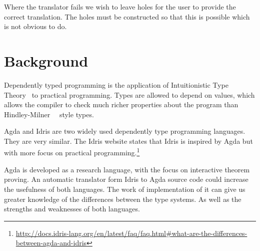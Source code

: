 \documentclass[parskip=half]{scrartcl}
\begin{document}
Where the translator fails we wish to leave holes for the user to provide the
correct translation. The holes must be constructed so that this is possible
which is not obvious to do.







\section{Background}

Dependently typed programming is the application of
Intuitionistic Type Theory~\cite{martinlof} to practical programming.  Types
are allowed to depend on values, which allows the compiler to check much richer
properties about the program than Hindley-Milner~\cite{hindley}~\cite{milner}
style types.

Agda and Idris are two widely used dependently type programming languages. They
are very similar. The Idris website states that Idris is inspired
by Agda but with more focus on practical
programming.\footnote{\url{http://docs.idris-lang.org/en/latest/faq/faq.html\#what-are-the-differences-between-agda-and-idris}}

Agda is developed as a research language, with the focus on interactive theorem
proving.  An automatic translator form Idris to Agda source code could increase
the usefulness of both languages. The work of implementation of it can give us
greater knowledge of the differences between the type systems. As well as the
strengths and weaknesses of both languages.
\end{document}
